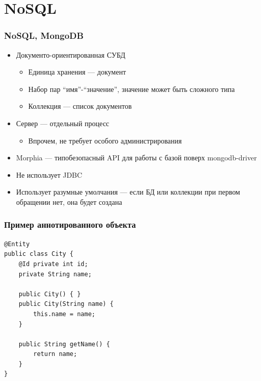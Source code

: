 \documentclass[xetex,mathserif,serif]{beamer}
\begin{document}
\begin{frame}
\begin{columns}
\begin{column}{0.25\textwidth}
\begin{center}
				\end{center}
			\end{column}
		\end{columns}
	\end{frame}

	\section{NoSQL}

	\begin{frame}
		\frametitle{NoSQL, MongoDB}
		\begin{itemize}
			\item Документо-ориентированная СУБД
			\begin{itemize}
				\item Единица хранения --- документ
				\item Набор пар ``имя''-``значение'', значение может быть сложного типа
				\item Коллекция --- список документов
			\end{itemize}
			\item Сервер --- отдельный процесс
			\begin{itemize}
				\item Впрочем, не требует особого администрирования
			\end{itemize}
			\item Morphia --- типобезопасный API для работы с базой поверх mongodb-driver
			\item Не использует JDBC
			\item Использует разумные умолчания --- если БД или коллекции при первом обращении нет, она будет создана
		\end{itemize}
	\end{frame}

	\begin{frame}[fragile]
		\frametitle{Пример аннотированного объекта}
		\begin{footnotesize}
			\begin{verbatim}
@Entity
public class City {
    @Id private int id;
    private String name;

    public City() { }
    public City(String name) {
        this.name = name;
    }

    public String getName() {
        return name;
    }
}
			\end{verbatim}
		\end{footnotesize}
	\end{frame}
\end{document}
